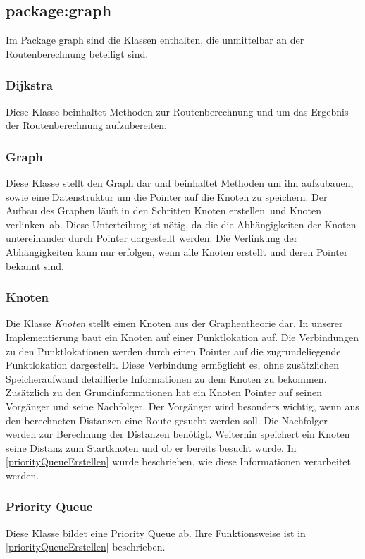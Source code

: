 \documentclass[12pt, a4paper, ngerman]{article}
\begin{document}
\subsection{package:graph}
Im Package graph sind die Klassen enthalten, die unmittelbar an der Routenberechnung beteiligt sind.

\subsubsection{Dijkstra}
Diese Klasse beinhaltet Methoden zur Routenberechnung und um das Ergebnis der Routenberechnung aufzubereiten. 

\subsubsection{Graph}
Diese Klasse stellt den Graph dar und beinhaltet Methoden um ihn aufzubauen, sowie eine Datenstruktur um die Pointer auf die Knoten zu speichern. Der Aufbau des Graphen läuft in den Schritten \glqq Knoten erstellen\grqq~und \glqq Knoten verlinken\grqq~ab. Diese Unterteilung ist nötig, da die die Abhängigkeiten der Knoten untereinander durch Pointer dargestellt werden. Die Verlinkung der Abhängigkeiten kann nur erfolgen, wenn alle Knoten erstellt und deren Pointer bekannt sind.



\subsubsection{Knoten \label{class:Knoten}}
Die Klasse \textit{Knoten} stellt einen Knoten aus der Graphentheorie dar. In unserer Implementierung baut ein Knoten auf einer Punktlokation auf. Die Verbindungen zu den Punktlokationen werden durch einen Pointer auf die zugrundeliegende Punktlokation dargestellt. Diese Verbindung ermöglicht es, ohne zusätzlichen Speicheraufwand detaillierte Informationen zu dem Knoten zu bekommen. Zusätzlich zu den Grundinformationen hat ein Knoten Pointer auf seinen Vorgänger und seine Nachfolger. Der Vorgänger wird besonders wichtig, wenn aus den berechneten Distanzen eine Route gesucht werden soll. Die Nachfolger werden zur Berechnung der Distanzen benötigt. Weiterhin speichert ein Knoten seine Distanz zum Startknoten und ob er bereits besucht wurde. In \ref{priorityQueueErstellen} wurde beschrieben, wie diese Informationen verarbeitet werden.


\subsubsection{Priority Queue}
Diese Klasse bildet eine Priority Queue ab. Ihre Funktionsweise ist in \ref{priorityQueueErstellen} beschrieben. 
\end{document}
